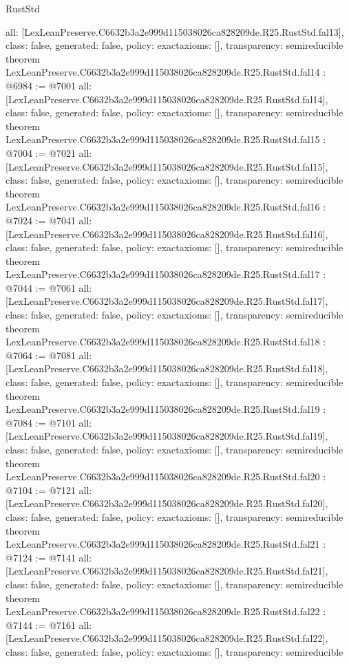 \begin{lexlean}{RustStd}
\begin{coremodule}
{  all: [LexLeanPreserve.C6632b3a2e999d115038026ca828209de.R25.RustStd.fal13],
  class: false,
  generated: false,
  policy: exact{axioms: []},
  transparency: semireducible
}
theorem LexLeanPreserve.C6632b3a2e999d115038026ca828209de.R25.RustStd.fal14 : @6984 := @7001 {
  all: [LexLeanPreserve.C6632b3a2e999d115038026ca828209de.R25.RustStd.fal14],
  class: false,
  generated: false,
  policy: exact{axioms: []},
  transparency: semireducible
}
theorem LexLeanPreserve.C6632b3a2e999d115038026ca828209de.R25.RustStd.fal15 : @7004 := @7021 {
  all: [LexLeanPreserve.C6632b3a2e999d115038026ca828209de.R25.RustStd.fal15],
  class: false,
  generated: false,
  policy: exact{axioms: []},
  transparency: semireducible
}
theorem LexLeanPreserve.C6632b3a2e999d115038026ca828209de.R25.RustStd.fal16 : @7024 := @7041 {
  all: [LexLeanPreserve.C6632b3a2e999d115038026ca828209de.R25.RustStd.fal16],
  class: false,
  generated: false,
  policy: exact{axioms: []},
  transparency: semireducible
}
theorem LexLeanPreserve.C6632b3a2e999d115038026ca828209de.R25.RustStd.fal17 : @7044 := @7061 {
  all: [LexLeanPreserve.C6632b3a2e999d115038026ca828209de.R25.RustStd.fal17],
  class: false,
  generated: false,
  policy: exact{axioms: []},
  transparency: semireducible
}
theorem LexLeanPreserve.C6632b3a2e999d115038026ca828209de.R25.RustStd.fal18 : @7064 := @7081 {
  all: [LexLeanPreserve.C6632b3a2e999d115038026ca828209de.R25.RustStd.fal18],
  class: false,
  generated: false,
  policy: exact{axioms: []},
  transparency: semireducible
}
theorem LexLeanPreserve.C6632b3a2e999d115038026ca828209de.R25.RustStd.fal19 : @7084 := @7101 {
  all: [LexLeanPreserve.C6632b3a2e999d115038026ca828209de.R25.RustStd.fal19],
  class: false,
  generated: false,
  policy: exact{axioms: []},
  transparency: semireducible
}
theorem LexLeanPreserve.C6632b3a2e999d115038026ca828209de.R25.RustStd.fal20 : @7104 := @7121 {
  all: [LexLeanPreserve.C6632b3a2e999d115038026ca828209de.R25.RustStd.fal20],
  class: false,
  generated: false,
  policy: exact{axioms: []},
  transparency: semireducible
}
theorem LexLeanPreserve.C6632b3a2e999d115038026ca828209de.R25.RustStd.fal21 : @7124 := @7141 {
  all: [LexLeanPreserve.C6632b3a2e999d115038026ca828209de.R25.RustStd.fal21],
  class: false,
  generated: false,
  policy: exact{axioms: []},
  transparency: semireducible
}
theorem LexLeanPreserve.C6632b3a2e999d115038026ca828209de.R25.RustStd.fal22 : @7144 := @7161 {
  all: [LexLeanPreserve.C6632b3a2e999d115038026ca828209de.R25.RustStd.fal22],
  class: false,
  generated: false,
  policy: exact{axioms: []},
  transparency: semireducible
}
\end{coremodule}
\end{lexlean}
